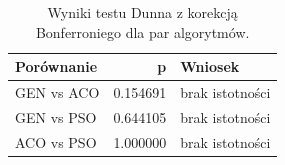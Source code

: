 \begin{table}
\caption{Wyniki testu Dunna z korekcją Bonferroniego dla par algorytmów.}
\label{tab:dunn_pairs}
\begin{tabular}{lrl}
\toprule
Porównanie & p & Wniosek \\
\midrule
GEN vs ACO & 0.154691 & brak istotności \\
GEN vs PSO & 0.644105 & brak istotności \\
ACO vs PSO & 1.000000 & brak istotności \\
\bottomrule
\end{tabular}
\end{table}
